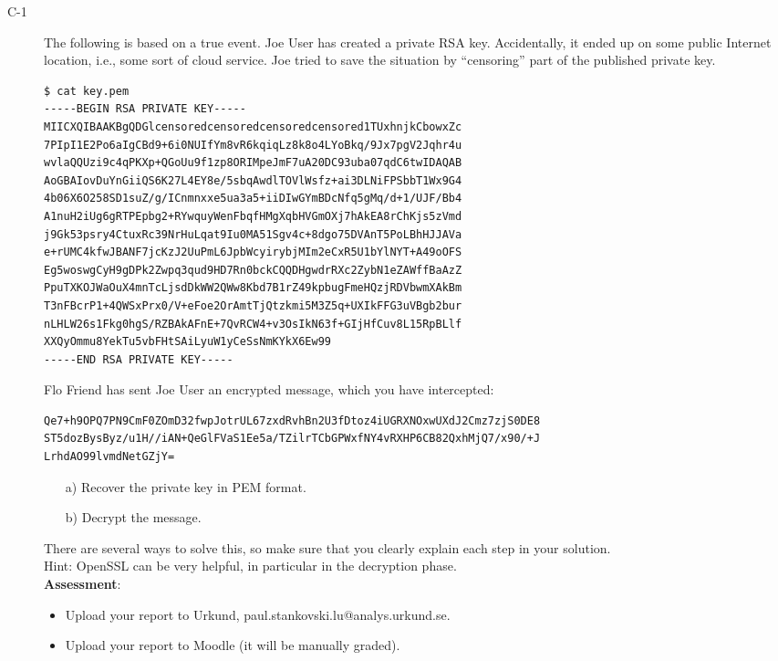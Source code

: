\documentclass{article}
\begin{document}
\begin{description}
	\item[C-1]{The following is based on a true event. Joe User has created a private RSA key. Accidentally, it ended up on some public Internet location, i.e., some sort of cloud service. Joe tried to save the situation by ``censoring'' part of the published private key.
\begin{verbatim}
$ cat key.pem
-----BEGIN RSA PRIVATE KEY-----
MIICXQIBAAKBgQDGlcensoredcensoredcensoredcensored1TUxhnjkCbowxZc
7PIpI1E2Po6aIgCBd9+6i0NUIfYm8vR6kqiqLz8k8o4LYoBkq/9Jx7pgV2Jqhr4u
wvlaQQUzi9c4qPKXp+QGoUu9f1zp8ORIMpeJmF7uA20DC93uba07qdC6twIDAQAB
AoGBAIovDuYnGiiQS6K27L4EY8e/5sbqAwdlTOVlWsfz+ai3DLNiFPSbbT1Wx9G4
4b06X6O258SD1suZ/g/ICnmnxxe5ua3a5+iiDIwGYmBDcNfq5gMq/d+1/UJF/Bb4
A1nuH2iUg6gRTPEpbg2+RYwquyWenFbqfHMgXqbHVGmOXj7hAkEA8rChKjs5zVmd
j9Gk53psry4CtuxRc39NrHuLqat9Iu0MA51Sgv4c+8dgo75DVAnT5PoLBhHJJAVa
e+rUMC4kfwJBANF7jcKzJ2UuPmL6JpbWcyirybjMIm2eCxR5U1bYlNYT+A49oOFS
Eg5woswgCyH9gDPk2Zwpq3qud9HD7Rn0bckCQQDHgwdrRXc2ZybN1eZAWffBaAzZ
PpuTXKOJWaOuX4mnTcLjsdDkWW2QWw8Kbd7B1rZ49kpbugFmeHQzjRDVbwmXAkBm
T3nFBcrP1+4QWSxPrx0/V+eFoe2OrAmtTjQtzkmi5M3Z5q+UXIkFFG3uVBgb2bur
nLHLW26s1Fkg0hgS/RZBAkAFnE+7QvRCW4+v3OsIkN63f+GIjHfCuv8L15RpBLlf
XXQyOmmu8YekTu5vbFHtSAiLyuW1yCeSsNmKYkX6Ew99
-----END RSA PRIVATE KEY-----
\end{verbatim}

Flo Friend has sent Joe User an encrypted message,
which you have intercepted:
\begin{verbatim}
Qe7+h9OPQ7PN9CmF0ZOmD32fwpJotrUL67zxdRvhBn2U3fDtoz4iUGRXNOxwUXdJ2Cmz7zjS0DE8
ST5dozBysByz/u1H//iAN+QeGlFVaS1Ee5a/TZilrTCbGPWxfNY4vRXHP6CB82QxhMjQ7/x90/+J
LrhdAO99lvmdNetGZjY=
\end{verbatim}
\begin{itemize}
\item[a)] Recover the private key in PEM format.
\item[b)] Decrypt the message.
\end{itemize}
There are several ways to solve this, so make sure that you clearly explain each step in your solution.\\
Hint: OpenSSL can be very helpful, in particular in the decryption phase.\\

	\textbf{Assessment}:
	\begin{itemize}
		\item Upload your report to Urkund, paul.stankovski.lu@analys.urkund.se.
		\item Upload your report to Moodle (it will be manually graded).
	\end{itemize}
	}
\end{description}
\end{document}

